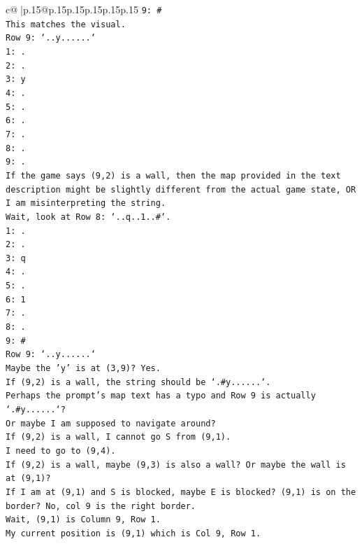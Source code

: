 \documentclass{article}
\begin{document}
{\begin{supertabular}{c@{$\;$}|p{.15\linewidth}@{}p{.15\linewidth}p{.15\linewidth}p{.15\linewidth}p{.15\linewidth}p{.15\linewidth}}
{{{\texttt{9: \#} \\
\texttt{This matches the visual.} \\
\texttt{Row 9: `..y......`} \\
\texttt{1: .} \\
\texttt{2: .} \\
\texttt{3: y} \\
\texttt{4: .} \\
\texttt{5: .} \\
\texttt{6: .} \\
\texttt{7: .} \\
\texttt{8: .} \\
\texttt{9: .} \\
\texttt{If the game says (9,2) is a wall, then the map provided in the text description might be slightly different from the actual game state, OR I am misinterpreting the string.} \\
\texttt{Wait, look at Row 8: `..q..1..\#`.} \\
\texttt{1: .} \\
\texttt{2: .} \\
\texttt{3: q} \\
\texttt{4: .} \\
\texttt{5: .} \\
\texttt{6: 1} \\
\texttt{7: .} \\
\texttt{8: .} \\
\texttt{9: \#} \\
\texttt{Row 9: `..y......`} \\
\texttt{Maybe the 'y' is at (3,9)? Yes.} \\
\texttt{If (9,2) is a wall, the string should be `.\#y......`.} \\
\texttt{Perhaps the prompt's map text has a typo and Row 9 is actually `.\#y......`?} \\
\texttt{Or maybe I am supposed to navigate around?} \\
\texttt{If (9,2) is a wall, I cannot go S from (9,1).} \\
\texttt{I need to go to (9,4).} \\
\texttt{If (9,2) is a wall, maybe (9,3) is also a wall? Or maybe the wall is at (9,1)?} \\
\texttt{If I am at (9,1) and S is blocked, maybe E is blocked? (9,1) is on the border? No, col 9 is the right border.} \\
\texttt{Wait, (9,1) is Column 9, Row 1.} \\
\texttt{My current position is (9,1) which is Col 9, Row 1.} \\
}}}
\end{supertabular}}
\end{document}
